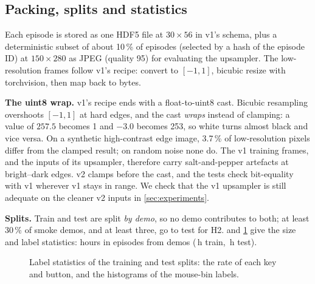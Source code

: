 \begin{table}[t]
  \centering\small
  \caption{Label accuracy of the state-derived actions on a hand-checked clip of about two minutes.}
  \label{tab:labelacc}
\end{table}

\subsection{Packing, splits and statistics}
Each episode is stored as one HDF5 file at $30{\times}56$ in v1's schema, plus a deterministic subset of about 10\,\% of episodes (selected by a hash of the episode ID) at $150{\times}280$ as JPEG (quality 95) for evaluating the upsampler.
The low-resolution frames follow v1's recipe: convert to $[-1,1]$, bicubic resize with torchvision, then map back to bytes.

\textbf{The uint8 wrap.}
v1's recipe ends with a float-to-uint8 cast.
Bicubic resampling overshoots $[-1,1]$ at hard edges, and the cast \emph{wraps} instead of clamping: a value of $257.5$ becomes 1 and $-3.0$ becomes 253, so white turns almost black and vice versa.
On a synthetic high-contrast edge image, 3.7\,\% of low-resolution pixels differ from the clamped result; on random noise none do.
The v1 training frames, and the inputs of its upsampler, therefore carry salt-and-pepper artefacts at bright--dark edges.
v2 clamps before the cast, and the tests check bit-equality with v1 wherever v1 stays in range.
We check that the v1 upsampler is still adequate on the cleaner v2 inputs in \cref{sec:experiments}.

\textbf{Splits.}
Train and test are split \emph{by demo}, so no demo contributes to both; at least 30\,\% of smoke demos, and at least three, go to test for H2.
 and \cref{fig:dstats} give the size and label statistics: \TBDhours hours in \TBDnumepisodes episodes from \TBDnumdemos demos (\TBDtrainhours\,h train, \TBDtesthours\,h test).

\begin{table}[t]
  \centering\small
  \caption{Dataset size per episode kind and split.}
  \label{tab:dataset}
\end{table}

\begin{figure}[t]
  \centering
  \caption{Label statistics of the training and test splits: the rate of each key and button, and the histograms of the mouse-bin labels.}
  \label{fig:dstats}
\end{figure}
